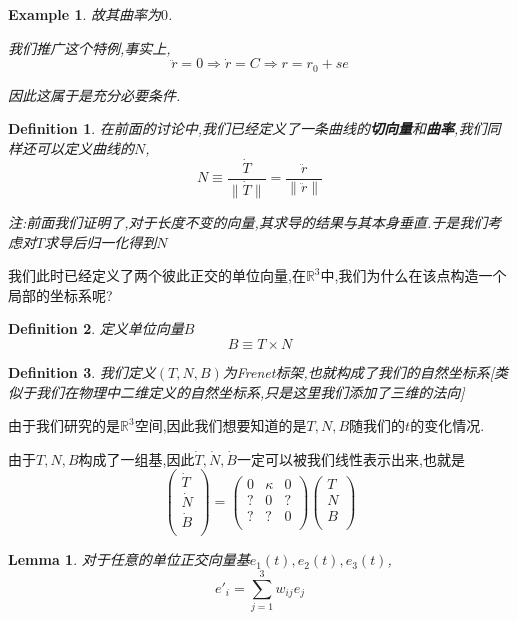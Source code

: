 \documentclass[11pt,hyperref,a4paper,UTF8]{ctexart}
\newtheorem{lemma}{Lemma}[subsection]
\newtheorem{example}{Example}[subsection]
\newtheorem{definition}{Definition}[subsection]
\newcommand{\RR}{\mathbb{R}}
\begin{document}
\begin{CJK}{UTF8}{gkai}
\begin{example}
  故其曲率为$0$.

  我们推广这个特例,事实上,
  \[\ddot{r} = 0 \Rightarrow \dot{r} = C \Rightarrow r = r_0 + se\]

  因此这属于是充分必要条件.
\end{example}

\begin{definition}
  在前面的讨论中,我们已经定义了一条曲线的\textbf{切向量}和\textbf{曲率},我们同样还可以定义曲线的$N$,
  \[N \equiv \frac{\dot{T}}{\|\dot{T}\|} = \frac{\ddot{r}}{\|\ddot{r}\|} \]

  注:前面我们证明了,对于长度不变的向量,其求导的结果与其本身垂直.于是我们考虑对$T$求导后归一化得到$N$
\end{definition}

我们此时已经定义了两个彼此正交的单位向量,在$\RR^3$中,我们为什么在该点构造一个局部的坐标系呢?

\begin{definition}
  定义单位向量$B$
  \[B \equiv T \times N\]
\end{definition}

\begin{definition}
  我们定义$(T,N,B)$为Frenet标架,也就构成了我们的自然坐标系[类似于我们在物理中二维定义的自然坐标系,只是这里我们添加了三维的法向]
\end{definition}

由于我们研究的是$\RR^3$空间,因此我们想要知道的是$T,N,B$随我们的$t$的变化情况.

由于$T,N,B$构成了一组基,因此$\dot{T},\dot{N},\dot{B}$一定可以被我们线性表示出来,也就是
\[\begin{pmatrix}
  \dot{T}\\
  \dot{N}\\
  \dot{B}\\
\end{pmatrix}
=
\begin{pmatrix}
  0&\kappa&0\\
  ?&0&?\\
  ?&?&0\\
\end{pmatrix}
\begin{pmatrix}
  T\\
  N\\
  B\\
\end{pmatrix}
\]

\begin{lemma}
  对于任意的单位正交向量基$e_1(t),e_2(t),e_3(t)$,
  \[e'_i = \sum_{j = 1}^{3} w_{ij}e_j\]


\end{lemma}
\end{CJK}
\end{document}
